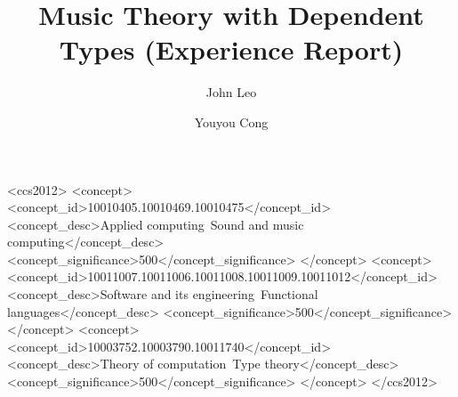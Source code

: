 \documentclass[acmsmall, review, anonymous]{acmart}
\begin{document}
\title{Music Theory with Dependent Types (Experience Report)}

\author{John Leo}

\author{Youyou Cong}

\renewcommand{\shortauthors}{Leo and Cong}

\newcommand{\fharm}{\textsc{Fharm}\xspace}

\begin{abstract}



\end{abstract}


\begin{CCSXML}
<ccs2012>
<concept>
<concept_id>10010405.10010469.10010475</concept_id>
<concept_desc>Applied computing~Sound and music computing</concept_desc>
<concept_significance>500</concept_significance>
</concept>
<concept>
<concept_id>10011007.10011006.10011008.10011009.10011012</concept_id>
<concept_desc>Software and its engineering~Functional languages</concept_desc>
<concept_significance>500</concept_significance>
</concept>
<concept>
<concept_id>10003752.10003790.10011740</concept_id>
<concept_desc>Theory of computation~Type theory</concept_desc>
<concept_significance>500</concept_significance>
</concept>
</ccs2012>
\end{CCSXML}


\maketitle









\end{document}

